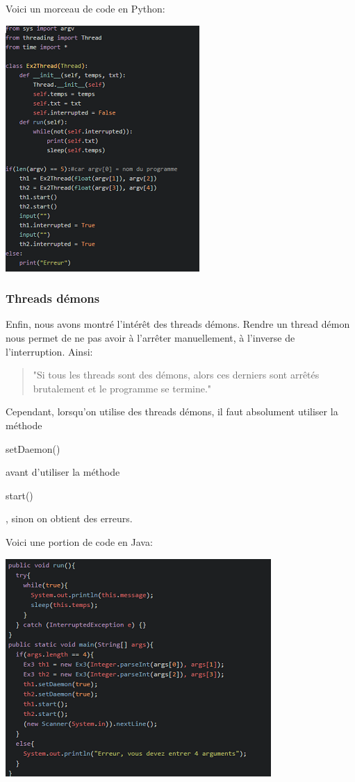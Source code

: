 \documentclass{article}
\begin{document}
Voici un morceau de code en Python:
\begin{center}
\includegraphics{ex1_2py.png}
\end{center}


\subsubsection{Threads démons}
\label{section : threaddemon}

Enfin, nous avons montré l'intérêt des threads démons. Rendre un thread démon nous permet de ne pas avoir à l'arrêter manuellement, à l'inverse de l'interruption. Ainsi: \begin{quote} \begin{it}"Si tous les threads sont des démons, alors ces derniers sont arrêtés brutalement et le programme se termine."\end{it} \end{quote}
Cependant, lorsqu'on utilise des threads démons, il faut absolument utiliser la méthode \begin{it}setDaemon()\end{it} avant d'utiliser la méthode \begin{it}start()\end{it}, sinon on obtient des erreurs.

Voici une portion de code en Java:
\begin{center}
\includegraphics{ex1_3.png}
\end{center}
\end{document}
